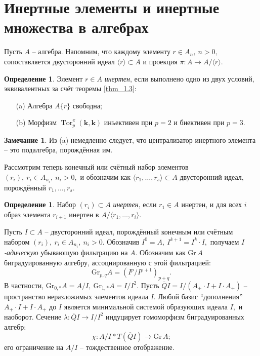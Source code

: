 \documentclass[10pt,a4paper]{article}
\DeclareMathOperator{\Tor}{Tor}
\def\k{\mathbf{k}}
\theoremstyle{definition}
\newtheorem{dfn}[thm]{Определение}
\newtheorem{rmk}[thm]{Замечание}
\begin{document}
\section{Инертные элементы и инертные множества в алгебрах}\label{section:2}
Пусть $A$ -- алгебра. Напомним, что каждому элементу $r\in A_n,~n>0,$ сопоставляется двусторонний идеал $\langle r\rangle \subset A$ и проекция $\pi:A\to A/\langle r\rangle.$
\begin{dfn}\label{dfn_2.1}
Элемент $r\in A$ \emph{инертен}, если выполнено одно из двух условий, эквивалентных за счёт теоремы \ref{thm_1.3}:
\begin{enumerate}
\item[(a)] Алгебра $A\{r\}$ свободна;
\item[(b)] Морфизм $\Tor_p^{\pi}(\k,\k)$ инъективен при $p=2$ и биективен при $p=3.$
\end{enumerate}
\end{dfn}
\begin{rmk} Из (a) немедленно следует, что централизатор инертного элемента -- это подалгебра, порождённая им.
\end{rmk}

Рассмотрим теперь конечный или счётный набор элементов $(r_i),~r_i\in A_{n_i},~n_i>0,$ и обозначим как $\langle r_1,\dots, r_s\rangle\subset A$ двусторонний идеал, порождённый $r_1,\dots,r_s.$
\begin{dfn}
Набор $(r_i)\subset A$ \emph{инертен}, если $r_1\in A$ инертен, и для всех $i$ образ элемента $r_{i+1}$ инертен в $A/\langle r_1,\dots, r_i\rangle.$
\end{dfn}

Пусть $I\subset A$ -- двусторонний идеал, порождённый конечным или счётным набором $(r_i),~r_i\in A_{n_i},~n_i>0.$ Обозначив $I^0=A,~I^{k+1}=I^k\cdot I,$ получаем \emph{$I$-адическую} убывающую фильтрацию на $A.$ Обозначим как $\mathrm{Gr}\,A$ биградуированную алгебру, ассоциированную с этой фильтрацией:
$$\mathrm{Gr}_{p,q}A=(I^p/I^{p+1})_{p+q}.$$ В частности, $\mathrm{Gr}_{0,*}A=A/I,~\mathrm{Gr}_{1,*}A=I/I^2.$
Пусть $\overline{Q}I=I/(A_+\cdot I+I\cdot A_+)$ -- пространство неразложимых элементов идеала $I.$ Любой базис ``дополнения'' $A_+\cdot I+I\cdot A_+$ до $I$ является минимальной системой образующих идеала $I,$ и наоборот. Сечение $\lambda:\overline{Q}I\to I/I^2$ индуцирует гомоморфизм биградуированных алгебр:
$$\chi:A/I\ast T(\overline{Q}I)\to \mathrm{Gr}\,A;$$ его ограничение на $A/I$ -- тождественное отображение.
\end{document}
